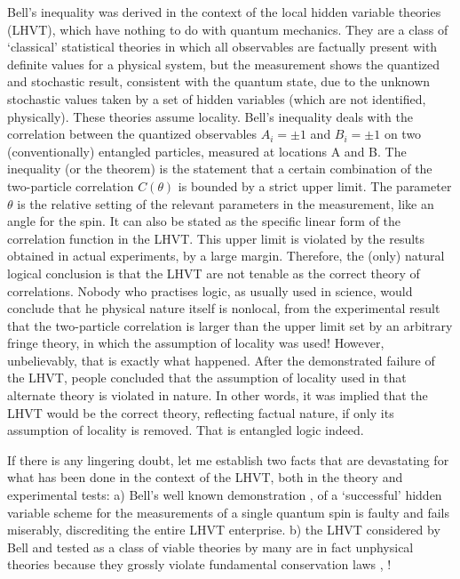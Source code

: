Bell's inequality \cite{chap14-key12} was derived in the context of the local hidden variable theories
(LHVT), which have nothing to do with quantum mechanics. They are a class of `classical'
statistical theories in which all observables are factually present with definite values for a
physical system, but the measurement shows the quantized and stochastic result, consistent
with the quantum state, due to the unknown stochastic values taken by a set of hidden variables (which are not identified, physically). These theories assume locality. Bell's inequality deals with the correlation between the quantized observables $A_i = \pm 1$ and $B_i = \pm 1$ on two (conventionally)
entangled particles, measured at locations A and B. The inequality (or the theorem) is the
statement that a certain combination of the two-particle correlation $C (\theta)$ is bounded by a
strict upper limit. The parameter $\theta$ is the relative setting of the relevant parameters in the
measurement, like an angle for the spin. It can also be stated as the specific linear
form of the correlation function in the LHVT. This upper limit is violated by the results
obtained in actual experiments, by a large margin. Therefore, the (only) natural logical
conclusion is that the LHVT are not tenable as the correct theory of correlations. Nobody who practises
logic, as usually used in science, would conclude that he physical nature itself is nonlocal, from
the experimental result that the two-particle correlation is larger than the upper limit set
by an arbitrary fringe theory, in which the assumption of locality was used! However, 
unbelievably, that is exactly what happened. After the demonstrated failure of the LHVT,
people concluded that the assumption of locality used in that alternate theory is violated in nature. In
other words, it was implied that the LHVT would be the correct theory, reflecting factual nature, if only its
assumption of locality is removed. That is entangled logic indeed.

If there is any lingering doubt, let me establish two facts that are devastating for what
has been done in the context of the LHVT, both in the theory and experimental tests: a)
Bell's well known demonstration \cite{chap14-key12}, \cite{chap14-key13} of a `successful' hidden variable scheme for the
measurements of a single quantum spin is faulty and fails miserably, discrediting the entire
LHVT enterprise. b) the LHVT considered by Bell and tested as a class of viable theories by many
are in fact unphysical theories because they grossly violate fundamental conservation laws
\cite{chap14-key14}, \cite{chap14-key15}!
\bigskip

